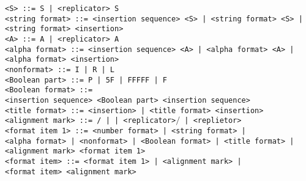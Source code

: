 \documentclass[a4paper,11pt]{article}
\begin{document}
\begin{flushleft}
\vspace{0.2em}\texttt{<S> ::= S | <replicator> S}\\

\vspace{0.2em}\texttt{<string format> ::= <insertion sequence> <S> | <string format> <S> |\\
  \hspace{1.0cm}<string format> <insertion>}\\

\vspace{0.2em}\texttt{<A> ::= A | <replicator> A}\\

\vspace{0.2em}\texttt{<alpha format> ::= <insertion sequence> <A> | <alpha format> <A> |\\
  \hspace{1.0cm}<alpha format> <insertion>}\\

\vspace{0.2em}\texttt{<nonformat> ::= I | R | L}\\

\vspace{0.2em}\texttt{<Boolean part> ::= P | 5F | FFFFF | F}\\

\vspace{0.2em}\texttt{<Boolean format> ::=\\
  \hspace{1.0cm}<insertion sequence> <Boolean part> <insertion sequence>}\\

\vspace{0.2em}\texttt{<title format> ::= <insertion> | <title format> <insertion>}\\

\vspace{0.2em}\texttt{<alignment mark> ::= / | \mpow{} | <replicator>$/$ | <replietor>\mpow{}}\\

\vspace{0.2em}\texttt{<format item 1> ::= <number format> | <string format> |\\
  \hspace{1.0cm}<alpha format> | <nonformat> | <Boolean format> | <title format> |\\
  \hspace{1.0cm}<alignment mark> <format item 1>}\\

\vspace{0.2em}\texttt{<format item> ::= <format item 1> | <alignment mark> |\\
  \hspace{1.0cm}<format item> <alignment mark>}\\

\end{flushleft}
\end{document}
